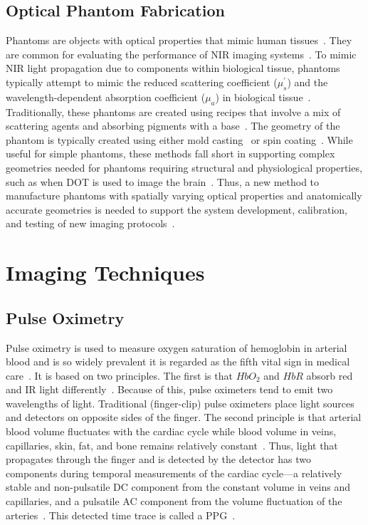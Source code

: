 \subsection{Optical Phantom Fabrication}
Phantoms are objects with optical properties that mimic human tissues~\cite{Pogue2006}. They are common for evaluating the performance of \ac{NIR} imaging systems~\cite{Pogue2006}. To mimic \ac{NIR} light propagation due to components within biological tissue, phantoms typically attempt to mimic the reduced scattering coefficient ($\mu_s^{'}$) and the wavelength-dependent absorption coefficient ($\mu_a$) in biological tissue~\cite{Dempsey2017}. Traditionally, these phantoms are created using recipes that involve a mix of scattering agents and absorbing pigments with a base~\cite{Hebden1995,Dong2015}. The geometry of the phantom is typically created using either mold casting~\cite{Hahn2012,Mobashsher2014} or spin coating~\cite{Park2013}. While useful for simple phantoms, these methods fall short in supporting complex geometries needed for phantoms requiring structural and physiological properties, such as when \ac{DOT} is used to image the brain~\cite{Hebden2002,Villringer1997}. Thus, a new method to manufacture phantoms with spatially varying optical properties and anatomically accurate geometries is needed to support the system development, calibration, and testing of new imaging protocols~\cite{Cerussi2012,Diep2015}.  



\section{Imaging Techniques}
\label{chap:background:techniques}
\subsection{Pulse Oximetry}
Pulse oximetry is used to measure oxygen saturation of hemoglobin in arterial blood and is so widely prevalent it is regarded as the fifth vital sign in medical care~\cite{Neff1988}. It is based on two principles. The first is that $HbO_2$ and $HbR$ absorb red and \ac{IR} light differently~\cite{Bohn2015}. Because of this, pulse oximeters tend to emit two wavelengths of light. Traditional (finger-clip) pulse oximeters place light sources and detectors on opposite sides of the finger. The second principle is that arterial blood volume fluctuates with the cardiac cycle while blood volume in veins, capillaries, skin, fat, and bone remains relatively constant~\cite{Sinex1999}. Thus, light that propagates through the finger and is detected by the detector has two components during temporal measurements of the cardiac cycle---a relatively stable and non-pulsatile \ac{DC} component from the constant volume in veins and capillaries, and a pulsatile \ac{AC} component from the volume fluctuation of the arteries~\cite{Lopez2012}. This detected time trace is called a \ac{PPG}~\cite{Sinex1999}. 

